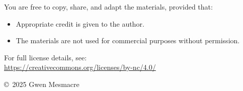\documentclass[12pt,a4paper]{article}
\begin{document}
You are free to copy, share, and adapt the materials, provided that:
\begin{itemize}
  \item Appropriate credit is given to the author.
  \item The materials are not used for commercial purposes without permission.
\end{itemize}

For full license details, see: \\
\url{https://creativecommons.org/licenses/by-nc/4.0/}


\vspace{1em}
\noindent \copyright~2025 Gwen Mesmacre
\end{document}
